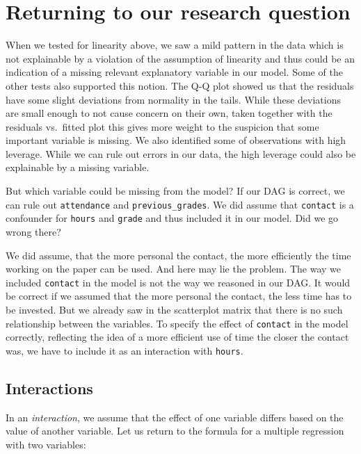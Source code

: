 \documentclass[
]{book}
\begin{document}
\hypertarget{returning-to-our-research-question-1}{%
\section{Returning to our research question}\label{returning-to-our-research-question-1}}

When we tested for linearity above, we saw a mild pattern in the data which is
not explainable by a violation of the assumption of linearity and thus could be
an indication of a missing relevant explanatory variable in our model. Some of
the other tests also supported this notion. The Q-Q plot showed us that the
residuals have some slight deviations from normality in the tails. While these
deviations are small enough to not cause concern on their own, taken together
with the residuals vs.~fitted plot this gives more weight to the suspicion that
some important variable is missing. We also identified some of observations with
high leverage. While we can rule out errors in our data, the high leverage could
also be explainable by a missing variable.

But which variable could be missing from the model?
If our DAG is correct, we can rule out \texttt{attendance} and
\texttt{previous\_grades}. We did assume that \texttt{contact} is a confounder for \texttt{hours} and
\texttt{grade} and thus included it in our model. Did we go wrong there?

We did assume, that the more personal the contact, the more efficiently the time
working on the paper can be used. And here may lie the problem. The way we included
\texttt{contact} in the model is not the way we reasoned in our DAG. It would be
correct if we assumed that the more personal the contact, the less time has to
be invested. But we already saw in the scatterplot matrix that there is no such
relationship between the variables. To specify the effect of \texttt{contact} in the
model correctly, reflecting the idea of a more efficient use of time the closer
the contact was, we have to include it as an interaction with \texttt{hours}.

\hypertarget{interactions}{%
\subsection{Interactions}\label{interactions}}

In an \emph{interaction}, we assume that the effect of one variable differs based on
the value of another variable. Let us return to the formula for a multiple
regression with two variables:
\end{document}
